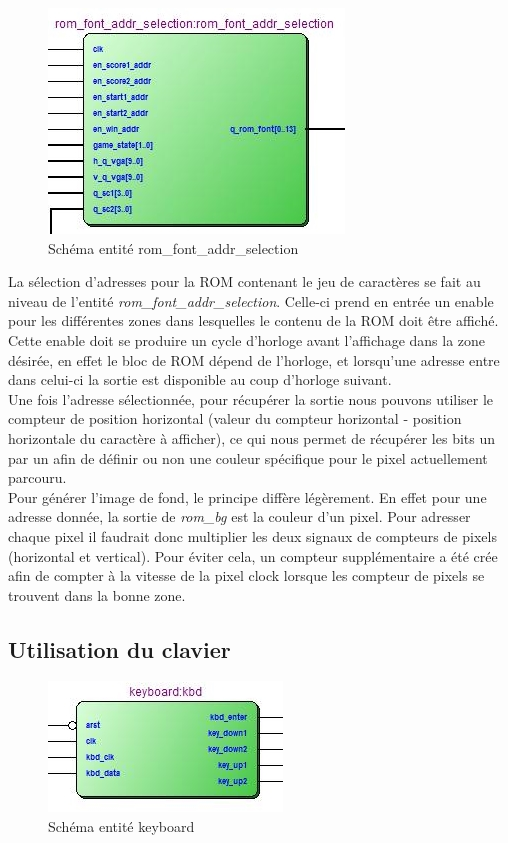 \begin{figure}[h!]
	\centering
	\includegraphics[scale=1.0]{images/romfontaddr.jpg}
	\caption{Schéma entité rom\_font\_addr\_selection}
	\label{fig:romfontaddr}
\end{figure}
La sélection d'adresses pour la ROM contenant le jeu de caractères se fait au niveau de l'entité \emph{rom\_font\_addr\_selection}. Celle-ci prend en entrée un enable pour les différentes zones dans lesquelles le contenu de la ROM doit être affiché. Cette enable doit se produire un cycle d'horloge avant l'affichage dans la zone désirée, en effet le bloc de ROM dépend de l'horloge, et lorsqu'une adresse entre dans celui-ci la sortie est disponible au coup d'horloge suivant.\\

Une fois l'adresse sélectionnée, pour récupérer la sortie nous pouvons utiliser le compteur de position horizontal (valeur du compteur horizontal - position horizontale du caractère à afficher), ce qui nous permet de récupérer les bits un par un afin de définir ou non une couleur spécifique pour le pixel actuellement parcouru.\\

Pour générer l'image de fond, le principe diffère légèrement. En effet pour une adresse donnée, la sortie de \emph{rom\_bg} est la couleur d'un pixel. Pour adresser chaque pixel il faudrait donc multiplier les deux signaux de compteurs de pixels (horizontal et vertical). Pour éviter cela, un compteur supplémentaire a été crée afin de compter à la vitesse de la pixel clock lorsque les compteur de pixels se trouvent dans la bonne zone.

\newpage
\subsection{Utilisation du clavier}
\begin{figure}[h!]
	\centering
	\includegraphics[scale=1.0]{images/kbdentity.jpg}
	\caption{Schéma entité keyboard}
	\label{fig:kbdentity}
\end{figure}

